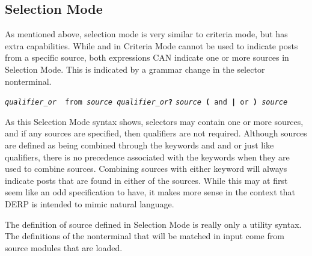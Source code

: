 \subsection{Selection Mode}
As mentioned above, selection mode is very similar to criteria mode, but has extra capabilities. While  and  in Criteria Mode
cannot be used to indicate posts from a specific source, both expressions CAN indicate one or more sources in Selection Mode. This is indicated by a grammar
change in the selector nonterminal.
\begin{description}[labelindent=1cm,leftmargin=\onelen,labelwidth=1cm]
     \texttt{\textit{qualifier\_or} \textbf{\textbar} from \textit{source qualifier\_or}\textbf{?}}
     \texttt{\textit{source} \textbf{(} and \textbf{|} or \textbf{)} \textit{source}}
\end{description}
As this Selection Mode syntax shows, selectors may contain one or more sources, and if any sources are specified, then qualifiers are not required. Although
sources are defined as being combined through the keywords and and or just like qualifiers, there is no precedence associated with the keywords when they
are used to combine sources. Combining sources with either keyword will always indicate posts that are found in either of the sources. While this may at
first seem like an odd specification to have, it makes more sense in the context that DERP is intended to mimic natural language.

The definition of source defined in Selection Mode is really only a utility syntax. The definitions of the nonterminal that will be matched in input come
from source modules that are loaded.

